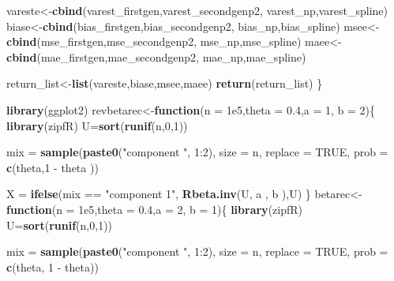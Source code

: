 \documentclass[12pt,twoside, a4paper]{reedthesis}
\newenvironment{Shaded}{}{}
\newcommand{\ControlFlowTok}[1]{\textcolor[rgb]{0.00,0.44,0.13}{\textbf{#1}}}
\newcommand{\DataTypeTok}[1]{\textcolor[rgb]{0.56,0.13,0.00}{#1}}
\newcommand{\DecValTok}[1]{\textcolor[rgb]{0.25,0.63,0.44}{#1}}
\newcommand{\FloatTok}[1]{\textcolor[rgb]{0.25,0.63,0.44}{#1}}
\newcommand{\KeywordTok}[1]{\textcolor[rgb]{0.00,0.44,0.13}{\textbf{#1}}}
\newcommand{\NormalTok}[1]{#1}
\newcommand{\OperatorTok}[1]{\textcolor[rgb]{0.40,0.40,0.40}{#1}}
\newcommand{\OtherTok}[1]{\textcolor[rgb]{0.00,0.44,0.13}{#1}}
\newcommand{\StringTok}[1]{\textcolor[rgb]{0.25,0.44,0.63}{#1}}
\begin{document}
\begin{Shaded}
\begin{Highlighting}[]
  
\NormalTok{  vareste<-}\KeywordTok{cbind}\NormalTok{(varest_firstgen,varest_secondgenp2,}
\NormalTok{                 varest_np,varest_spline)}
\NormalTok{  biase<-}\KeywordTok{cbind}\NormalTok{(bias_firstgen,bias_secondgenp2,}
\NormalTok{               bias_np,bias_spline)}
\NormalTok{  msee<-}\KeywordTok{cbind}\NormalTok{(mse_firstgen,mse_secondgenp2,}
\NormalTok{              mse_np,mse_spline)}
\NormalTok{  maee<-}\KeywordTok{cbind}\NormalTok{(mae_firstgen,mae_secondgenp2,}
\NormalTok{              mae_np,mae_spline)}
  
\NormalTok{  return_list<-}\KeywordTok{list}\NormalTok{(vareste,biase,msee,maee)}
  \KeywordTok{return}\NormalTok{(return_list)}
\NormalTok{\}}
\end{Highlighting}
\end{Shaded}
\begin{Shaded}
\begin{Highlighting}[]
\KeywordTok{library}\NormalTok{(ggplot2)}
\NormalTok{revbetarec<-}\ControlFlowTok{function}\NormalTok{(}\DataTypeTok{n =} \FloatTok{1e5}\NormalTok{,}\DataTypeTok{theta =} \FloatTok{0.4}\NormalTok{,}\DataTypeTok{a =} \DecValTok{1}\NormalTok{, }\DataTypeTok{b =} \DecValTok{2}\NormalTok{)\{}
  \KeywordTok{library}\NormalTok{(zipfR)}
\NormalTok{  U=}\KeywordTok{sort}\NormalTok{(}\KeywordTok{runif}\NormalTok{(n,}\DecValTok{0}\NormalTok{,}\DecValTok{1}\NormalTok{))}
  
\NormalTok{  mix =}\StringTok{ }\KeywordTok{sample}\NormalTok{(}\KeywordTok{paste0}\NormalTok{(}\StringTok{"component "}\NormalTok{, }\DecValTok{1}\OperatorTok{:}\DecValTok{2}\NormalTok{),}
               \DataTypeTok{size =}\NormalTok{ n, }\DataTypeTok{replace =} \OtherTok{TRUE}\NormalTok{, }\DataTypeTok{prob =} \KeywordTok{c}\NormalTok{(theta,}\DecValTok{1} \OperatorTok{-}\StringTok{ }\NormalTok{theta ))}
  
\NormalTok{  X =}\StringTok{ }\KeywordTok{ifelse}\NormalTok{(mix }\OperatorTok{==}\StringTok{ "component 1"}\NormalTok{,  }\KeywordTok{Rbeta.inv}\NormalTok{(U, a , b ),U)}
\NormalTok{\}}
\NormalTok{betarec<-}\ControlFlowTok{function}\NormalTok{(}\DataTypeTok{n =} \FloatTok{1e5}\NormalTok{,}\DataTypeTok{theta =} \FloatTok{0.4}\NormalTok{,}\DataTypeTok{a =} \DecValTok{2}\NormalTok{, }\DataTypeTok{b =} \DecValTok{1}\NormalTok{)\{}
  \KeywordTok{library}\NormalTok{(zipfR)}
\NormalTok{  U=}\KeywordTok{sort}\NormalTok{(}\KeywordTok{runif}\NormalTok{(n,}\DecValTok{0}\NormalTok{,}\DecValTok{1}\NormalTok{))}
  
\NormalTok{  mix =}\StringTok{ }\KeywordTok{sample}\NormalTok{(}\KeywordTok{paste0}\NormalTok{(}\StringTok{"component "}\NormalTok{, }\DecValTok{1}\OperatorTok{:}\DecValTok{2}\NormalTok{),}
               \DataTypeTok{size =}\NormalTok{ n, }\DataTypeTok{replace =} \OtherTok{TRUE}\NormalTok{, }\DataTypeTok{prob =} \KeywordTok{c}\NormalTok{(theta, }\DecValTok{1} \OperatorTok{-}\StringTok{ }\NormalTok{theta))}
  

\end{Highlighting}
\end{Shaded}
\end{document}
